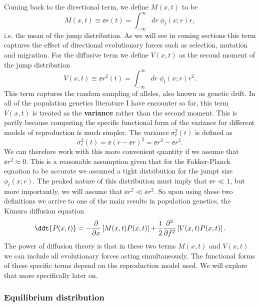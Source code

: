 Coming back to the directional term, we define $M(x, t)$ to be
\begin{equation}
  M(x, t) \equiv \ee{r(t)} = \int_{-\infty}^{\infty} dr \; \phi_t(x; r) r,
\end{equation}
i.e. the mean of the jump distribution. As we will see in coming sections this
term captures the effect of directional evolutionary forces such as selection,
mutation and migration. For the diffusive term we define $V(x, t)$ as the
second moment of the jump distribution
\begin{equation}
  V(x, t) \equiv \ee{r^2(t)} = \int_{-\infty}^{\infty} dr \; \phi_t(x; r) r^2.
\end{equation}
This term captures the random sampling of alleles, also known as genetic drift.
In all of the population genetics literature I have encounter so far, this term
$V(x, t)$ is treated as the \textbf{variance} rather than the second moment.
This is partly because computing the specific functional form of the variance
for different models of reproduction is much simpler. The variance
$\sigma_r^2(t)$ is defined as
\begin{equation}
  \sigma_r^2(t) = \ee{\left( r - \ee{r} \right)^2} = \ee{r^2} - \ee{r}^2.
\end{equation}
We can therefore work with this more convenient quantity if we assume that
$\ee{r}^2 \approx 0$. This is a reasonable assumption given that for the
Fokker-Planck equation to be accurate we assumed a tight distribution for the
jumpt size $\phi_t(x; r)$. The peaked nature of this distribution must imply
that $\ee{r} \ll 1$, but more importantly, we will assume that
$\ee{r}^2 \ll \ee{r^2}$. So upon using these two definitions we arrive to one
of the main results in population genetics, the Kimura diffusion equation
\begin{equation}
  \ddt{P(x, t)} = - {\partial \over \partial x}
  \left[
  M(x, t) P(x, t)
  \right] +
  {1 \over 2}{\partial^2 \over \partial f^2}
  \left[
  V(x, t) P(x, t)
  \right].
  \label{eq_kimura_diffusion}
\end{equation}
The power of diffusion theory is that in these two terms $M(x, t)$ and $V(x,
t)$ we can include all evolutionary forces acting simultaneously. The
functional forms of these specific terms depend on the reproduction model used.
We will explore that more specifically later on.

\subsubsection{Equilibrium distribution}

